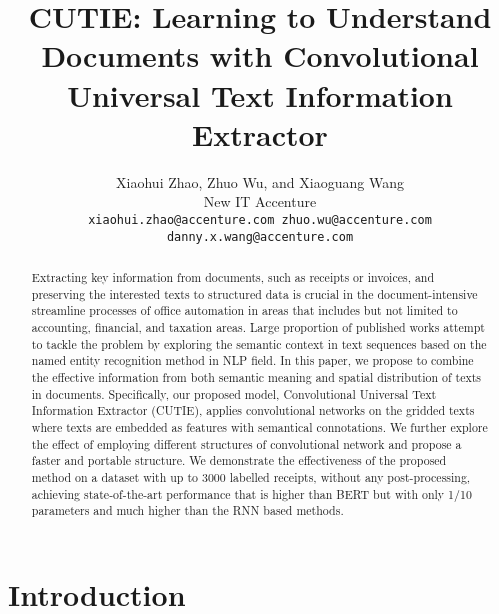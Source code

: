 \documentclass[10pt,twocolumn,letterpaper]{article}
\begin{document}
\title{CUTIE: Learning to Understand Documents with Convolutional Universal Text Information Extractor}

\author{
  Xiaohui Zhao, Zhuo Wu, and Xiaoguang Wang \\
  New IT Accenture \\
{\tt\small xiaohui.zhao@accenture.com zhuo.wu@accenture.com danny.x.wang@accenture.com}
}

\maketitle

\begin{abstract}
   Extracting key information from documents, such as receipts or invoices, and preserving the interested texts to structured data is crucial in the document-intensive streamline processes of office automation in areas that includes but not limited to accounting, financial, and taxation areas. Large proportion of published works attempt to tackle the problem by exploring the semantic context in text sequences based on the named entity recognition method in NLP field. In this paper, we propose to combine the effective information from both semantic meaning and spatial distribution of texts in documents. Specifically, our proposed model, Convolutional Universal Text Information Extractor (CUTIE), applies convolutional networks on the gridded texts where texts are embedded as features with semantical connotations. We further explore the effect of employing different structures of convolutional network and propose a faster and portable structure. We demonstrate the effectiveness of the proposed method on a dataset with up to 3000 labelled receipts, without any post-processing, achieving state-of-the-art performance that is higher than BERT but with only 1/10 parameters and much higher than the RNN based methods.
\end{abstract}

\section{Introduction}
\end{document}
